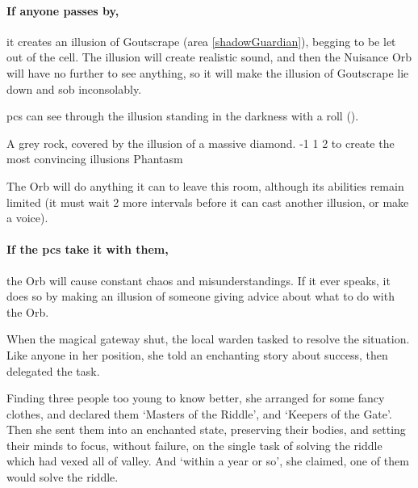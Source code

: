 \begin{multicols}{2}
\paragraph{If anyone passes by,}
it creates an illusion of Goutscrape (area \vref{shadowGuardian}), begging to be let out of the cell.
The illusion will create realistic sound, and then the Nuisance Orb will have no further  to see anything, so it will make the illusion of Goutscrape lie down and sob inconsolably.

\Glspl{pc} can see through the illusion standing in the darkness with a  roll
(\tn[12]).

  {A grey rock, covered by the illusion of a massive diamond.}%
  {-1}%
  {1}%
  {2}%
  {to create the most convincing illusions}%
  {Phantasm}%
  {
    \setcounter{Fire}{2}
    \setcounter{Earth}{2}
    \setcounter{Air}{2}
    \setcounter{Academics}{2}
    \setcounter{Survival}{1}
  }%

\showStdSpells[
  \setcounter{diceNo}{0}
]

The Orb will do anything it can to leave this room, although its abilities remain limited (it must wait 2 more \glspl{interval} before it can cast another illusion, or make a voice).

\paragraph{If the \glspl{pc} take it with them,}
the Orb will cause constant chaos and misunderstandings.
If it ever speaks, it does so by making an illusion of someone giving advice about what to do with the Orb.


\begin{exampletext}
  When the magical gateway shut, the local \gls{warden} tasked  to resolve the situation.
  Like anyone in her position, she told an enchanting story about success, then delegated the task.

  Finding three people too young to know better, she arranged for some fancy clothes, and declared them `Masters of the Riddle', and `Keepers of the Gate'.
  Then she sent them into an enchanted state, preserving their bodies, and setting their minds to focus, without failure, on the single task of solving the riddle which had vexed all of \gls{valley}.
  And `within a year or so', she claimed, one of them would solve the riddle.


\end{exampletext}
\end{multicols}
